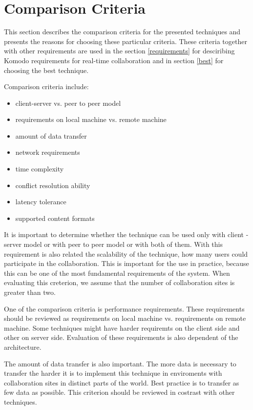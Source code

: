 \documentclass[12pt,oneside]{fithesis2}
\begin{document}
\section{Comparison Criteria} \label{comparison}
This section describes the comparison criteria for the presented techniques and presents the reasons for choosing these particular criteria. These criteria together with other requirements are used in the section \ref{requirements} for desciribing Komodo requirements for real-time collaboration and in section \ref{best} for choosing the best technique.
\par Comparison criteria include:
\begin{itemize}
\item client-server vs. peer to peer model
\item requirements on local machine vs. remote machine
\item amount of data transfer
\item network requirements
\item time complexity
\item conflict resolution ability
\item latency tolerance
\item supported content formats
\end{itemize}
\par It is important to determine whether the technique can be used only with client - server model or with peer to peer model or with both of them. With this requirement is also related the scalability of the technique, how many users could participate in the collaboration. This is important for the use in practice, because this can be one of the most fundamental requirements of the system. When evaluating this creterion, we assume that the number of collaboration sites is greater than two.
\par One of the comparison criteria is performance requirements. These requirements should be reviewed as requirements on local machine vs. requirements on remote machine. Some techniques might have harder requiremts on the client side and other on server side.  Evaluation of these requirements is also dependent of the architecture.
\par The amount of data transfer is also important. The more data is necessary to transfer the harder it is to implement this technique in enviroments with collaboration sites in distinct parts of the world. Best practice is to transfer as few data as possible. This criterion should be reviewed in costrast with other techniques.
\end{document}
